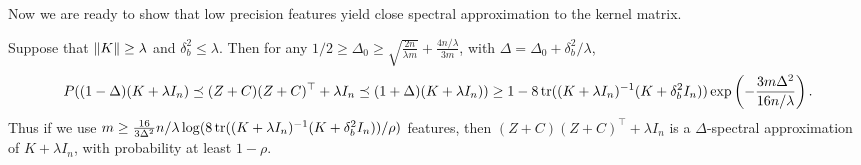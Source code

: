Now we are ready to show that low precision features yield close spectral
approximation to the kernel matrix.

\begin{theorem}

  Suppose that $\|K\| \geq \lambda$ and $\delta^2_b \leq \lambda$.
  Then for any $1/2 \geq \Delta_0 \geq \sqrt{\frac{2n}{\lambda m}} + \frac{4n/\lambda}{3m}$, with $\Delta =
  \Delta_0 + \delta^2_b / \lambda$,
  \begin{equation*}
    P((1 - \Delta)(K + \lambda I_n) \preceq (Z + C) (Z + C)^\top + \lambda I_n \preceq (1 + \Delta)(K + \lambda I_n)) \geq 1 - 8 \mathop{\rm tr}((K +
    \lambda I_n)^{-1} (K + \delta^2_b I_n)) \exp \left( -\frac{3m \Delta^2}{16n/\lambda} \right).
  \end{equation*}
  Thus if we use $m \geq \frac{16}{3 \Delta^2} n/\lambda \log (8 \mathop{\rm tr}((K + \lambda I_n)^{-1} (K +
  \delta^2_b I_n)) / \rho)$
  features, then $(Z + C) (Z + C)^\top + \lambda I_n$ is a $\Delta$-spectral approximation of $K + \lambda I_n$,
  with probability at least $1 - \rho$.
\end{theorem}


